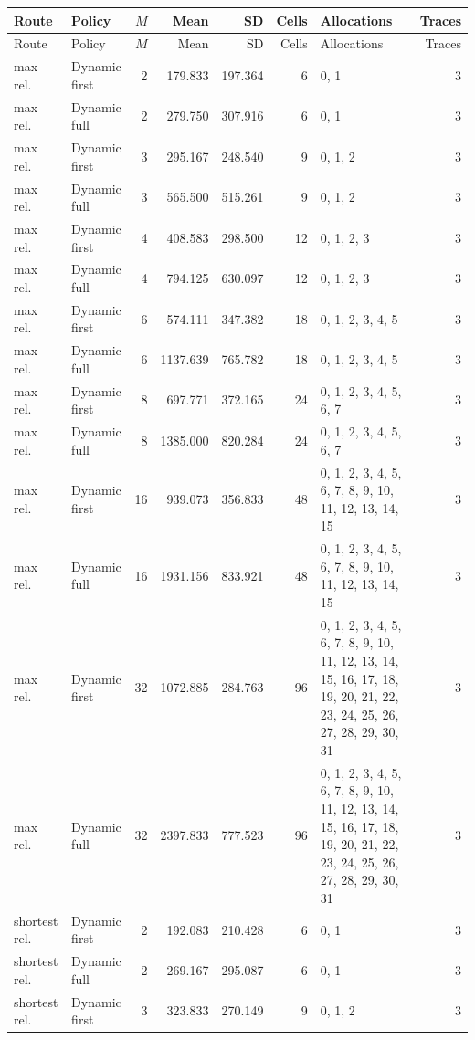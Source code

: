 \documentclass[10pt,a4paper]{article}
\begin{document}
\tiny\setlength{\tabcolsep}{2pt}\begin{longtable}{@{}p{23mm}p{29mm}rrrrp{36mm}r@{}}
\toprule Route & Policy & $M$ & Mean & SD & Cells & Allocations & Traces \\ \midrule\endfirsthead
\toprule Route & Policy & $M$ & Mean & SD & Cells & Allocations & Traces \\ \midrule\endhead
\bottomrule\endfoot
max rel. & Dynamic first & 2 & 179.833 & 197.364 & 6 & 0, 1 & 3 \\
max rel. & Dynamic full & 2 & 279.750 & 307.916 & 6 & 0, 1 & 3 \\
max rel. & Dynamic first & 3 & 295.167 & 248.540 & 9 & 0, 1, 2 & 3 \\
max rel. & Dynamic full & 3 & 565.500 & 515.261 & 9 & 0, 1, 2 & 3 \\
max rel. & Dynamic first & 4 & 408.583 & 298.500 & 12 & 0, 1, 2, 3 & 3 \\
max rel. & Dynamic full & 4 & 794.125 & 630.097 & 12 & 0, 1, 2, 3 & 3 \\
max rel. & Dynamic first & 6 & 574.111 & 347.382 & 18 & 0, 1, 2, 3, 4, 5 & 3 \\
max rel. & Dynamic full & 6 & 1137.639 & 765.782 & 18 & 0, 1, 2, 3, 4, 5 & 3 \\
max rel. & Dynamic first & 8 & 697.771 & 372.165 & 24 & 0, 1, 2, 3, 4, 5, 6, 7 & 3 \\
max rel. & Dynamic full & 8 & 1385.000 & 820.284 & 24 & 0, 1, 2, 3, 4, 5, 6, 7 & 3 \\
max rel. & Dynamic first & 16 & 939.073 & 356.833 & 48 & 0, 1, 2, 3, 4, 5, 6, 7, 8, 9, 10, 11, 12, 13, 14, 15 & 3 \\
max rel. & Dynamic full & 16 & 1931.156 & 833.921 & 48 & 0, 1, 2, 3, 4, 5, 6, 7, 8, 9, 10, 11, 12, 13, 14, 15 & 3 \\
max rel. & Dynamic first & 32 & 1072.885 & 284.763 & 96 & 0, 1, 2, 3, 4, 5, 6, 7, 8, 9, 10, 11, 12, 13, 14, 15, 16, 17, 18, 19, 20, 21, 22, 23, 24, 25, 26, 27, 28, 29, 30, 31 & 3 \\
max rel. & Dynamic full & 32 & 2397.833 & 777.523 & 96 & 0, 1, 2, 3, 4, 5, 6, 7, 8, 9, 10, 11, 12, 13, 14, 15, 16, 17, 18, 19, 20, 21, 22, 23, 24, 25, 26, 27, 28, 29, 30, 31 & 3 \\
shortest rel. & Dynamic first & 2 & 192.083 & 210.428 & 6 & 0, 1 & 3 \\
shortest rel. & Dynamic full & 2 & 269.167 & 295.087 & 6 & 0, 1 & 3 \\
shortest rel. & Dynamic first & 3 & 323.833 & 270.149 & 9 & 0, 1, 2 & 3 \\

\end{longtable}
\end{document}
